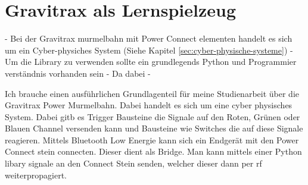 \chapter{Gravitrax als Lernspielzeug}

- Bei der Gravitrax murmelbahn mit Power Connect elementen handelt es sich um ein Cyber-physiches System (Siehe Kapitel \ref{sec:cyber-physische-systeme})
- Um die Library zu verwenden sollte ein grundlegends Python und Programmier verständnis vorhanden sein 
- Da dabei 
- 

    Ich brauche einen ausführlichen Grundlagenteil für meine Studienarbeit über die Gravitrax Power Murmelbahn. Dabei handelt es sich um eine cyber physisches System. Dabei gitb es Trigger Bausteine die Signale auf den Roten, Grünen oder Blauen Channel versenden kann und Bausteine wie Switches die auf diese Signale reagieren. Mittels Bluetooth Low Energie kann sich ein Endgerät mit den Power Connect stein connecten. Dieser dient als Bridge. Man kann mittels einer Python libary signale an den Connect Stein senden, welcher dieser dann per rf weiterpropagiert.
